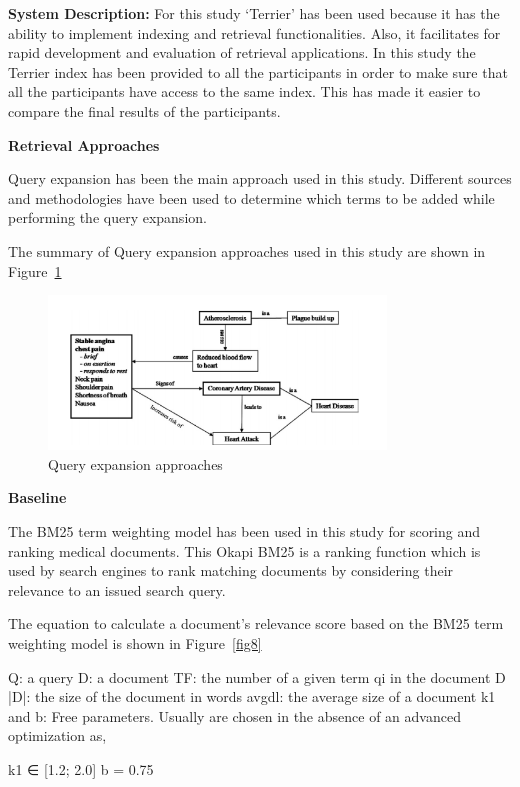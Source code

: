 \documentclass[]{article}
\begin{document}
\textbf{System Description:} For this study ‘Terrier’ has been used because it has the ability to implement indexing and retrieval functionalities. Also, it facilitates for rapid development and evaluation of retrieval applications. In this study the Terrier index has been provided to all the participants in order to make sure that all the participants have access to the same index. This has made it easier to compare the final results of the participants. 

\textbf{Retrieval Approaches}

Query expansion has been the main approach used in this study. Different sources and methodologies have been used to determine which terms to be added while performing the query expansion.   

The summary of Query expansion approaches used in this study are shown in Figure~\ref{fig7}

\begin{figure}[b!]
	\includegraphics[width=0.8\textwidth]{Capture7.png}
	\caption{Query expansion approaches \label{fig7}}
\end{figure}   

\textbf{Baseline}

The BM25 term weighting model has been used in this study for scoring and ranking medical documents. This Okapi BM25 is a ranking function which is used by search engines to rank matching documents by considering their relevance to an issued search query.      

The equation to calculate a document's relevance score based on the BM25 term weighting model is shown in Figure~\ref{fig8}

Q: a query 
D: a document
TF: the number of a given term qi in the document D
|D|: the size of the document in words 
avgdl: the average size of a document
k1 and b: Free parameters. Usually are chosen in the absence of an advanced optimization as,

k1 ∈ [1.2; 2.0] b = 0.75
\end{document}
